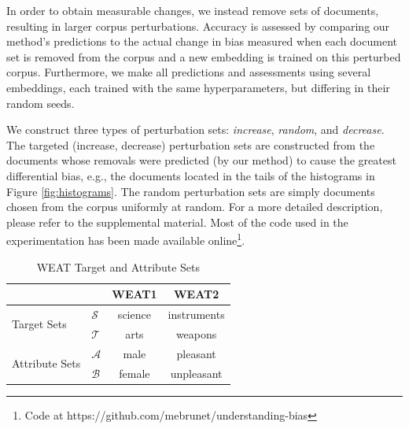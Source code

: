 \documentclass{article}
\begin{document}
In order to obtain measurable changes, we instead remove sets of documents, resulting in larger corpus perturbations.
Accuracy is assessed by comparing our method's predictions to the actual change in bias measured when each document set is removed from the corpus and a new embedding is trained on this perturbed corpus. 
Furthermore, we make all predictions and assessments using several embeddings, each trained with the same hyperparameters, but differing in their random seeds.

We construct three types of perturbation sets: \emph{increase}, \emph{random}, and \emph{decrease}.
The targeted (increase, decrease) perturbation sets are constructed from the documents whose removals were predicted (by our method) to cause the greatest differential bias, e.g., the documents located in the tails of the histograms in Figure \ref{fig:histograms}.
The random perturbation sets are simply documents chosen from the corpus uniformly at random.
For a more detailed description, please refer to the supplemental material. 
Most of the code used in the experimentation has been made available online\footnote{Code at https://github.com/mebrunet/understanding-bias}. 


\begin{table}
\caption{WEAT Target and Attribute Sets}
\label{tab:WEAT}
\centering
\begin{tabular}{ l l  c  c }
\hline
    & & WEAT1 & WEAT2\\ \hline
    \multirow{2}{*}{Target Sets}    & $\mathcal{S}$ & science & instruments \\
                                    & $\mathcal{T}$ & arts & weapons \\ \hline
    \multirow{2}{*}{Attribute Sets} & $\mathcal{A}$ & male & pleasant \\
                                    & $\mathcal{B}$ & female & unpleasant \\
                                 
\end{tabular}
\end{table}
\end{document}
